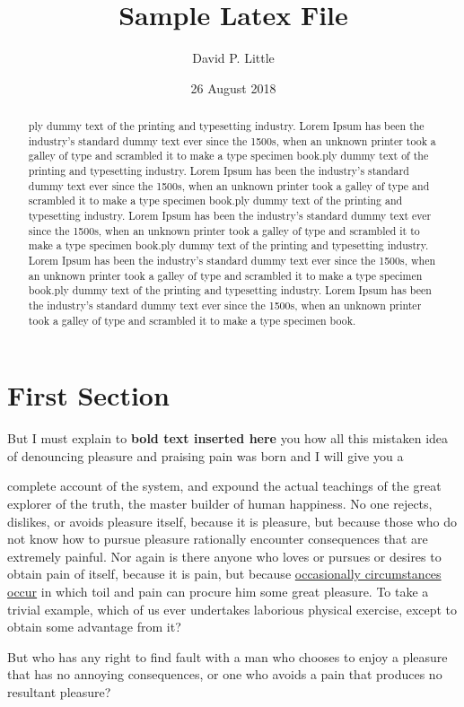 \documentclass[sigconf]{acmart}
\begin{document}
    \title{Sample Latex File}
    \author{David P. Little}
    \date{26 August 2018}
    \maketitle
\begin{abstract}
    ply dummy text of the printing and typesetting industry. Lorem Ipsum has been the industry's standard dummy \label{intro} text ever since the 1500s, when an unknown printer took a
    galley of type and scrambled it to make a type specimen book.ply dummy text of the printing and typesetting industry. Lorem Ipsum has been the industry's standard dummy \label{intro} text ever since the 1500s, when an unknown printer took a
    galley of type and scrambled it to make a type specimen book.ply dummy text of the printing and typesetting industry. Lorem Ipsum has been the industry's standard dummy \label{intro} text ever since the 1500s, when an unknown printer took a
    galley of type and scrambled it to make a type specimen book.ply dummy text of the printing and typesetting industry. Lorem Ipsum has been the industry's standard dummy \label{intro} text ever since the 1500s, when an unknown printer took a
    galley of type and scrambled it to make a type specimen book.ply dummy text of the printing and typesetting industry. Lorem Ipsum has been the industry's standard dummy \label{intro} text ever since the 1500s, when an unknown printer took a
    galley of type and scrambled it to make a type specimen book.
\end{abstract}
\section{First Section}

    But I must explain to \textbf{bold text inserted here} you how all  this mistaken idea of denouncing pleasure and praising pain was
    born and I will give you a
    \begin{center}
    complete account of the system, and expound the actual teachings of the great explorer of the truth, the master builder of human happiness. No one rejects, dislikes, or avoids pleasure itself, because it is pleasure, but because those who do not know how to pursue pleasure rationally encounter consequences that are extremely painful. Nor again is there anyone who loves or pursues or desires to
    obtain pain of itself, because it is pain, but because \underline{occasionally circumstances occur} in which toil and pain can procure him some great pleasure.
    To take a trivial example, which of us ever undertakes laborious physical exercise, except to obtain some advantage from it?
    \end{center}
    But who has any right to
    find fault with a man who chooses to enjoy a pleasure that has no annoying consequences, or one who avoids a pain that produces no resultant pleasure?
\end{document}
